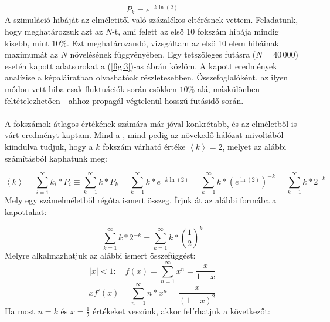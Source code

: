 \begin{equation}
    P_{k} = e^{-k \ln \left( 2 \right)}
\end{equation}
A szimuláció hibáját az elméletitől való százalékos eltérésnek vettem. Feladatunk, hogy meghatározzuk azt az $N$-t, ami felett az első 10 fokszám hibája mindig kisebb, mint $10\%$. Ezt meghatározandó, vizsgáltam az első 10 elem hibáinak maximumát az $N$ növelésének függvényében. Egy tetszőleges futásra ($N=40\,000$) esetén kapott adatsorokat a (\ref{fig:3})-as ábrán közlöm. A kapott eredmények analízise a képaláiratban olvashatóak részletesebben. Összefoglalóként, az ilyen módon vett hiba csak fluktuációk során csökken $10\%$ alá, máskülönben - feltételezhetően - ahhoz propagál végtelenül hosszú futásidő során.
\\ \\
A fokszámok átlagos értékének számára már jóval konkrétabb, és az elméletből is várt eredményt kaptam. Mind a \rrt, mind pedig az \apm növekedő hálózat mivoltából kiindulva tudjuk, hogy a $k$ fokszám várható értéke $\left< k \right> = 2$, melyet az alábbi számításból kaphatunk meg:

\begin{equation}
    \left< k \right>
    =
    \sum_{i = 1}^{\infty} k_{i} * P_{i}
    \equiv
    \sum_{k = 1}^{\infty} k * P_{k}
    =
    \sum_{k = 1}^{\infty} k * e^{-k \ln \left( 2 \right)}
    =
    \sum_{k = 1}^{\infty} k * \left( e^{\ln \left( 2 \right)} \right)^{-k}
    =
    \sum_{k = 1}^{\infty} k * 2^{-k}
\end{equation}
Mely egy számelméletből régóta ismert összeg. Írjuk át az alábbi formába a kapottakat:

\begin{equation}
    \sum_{k = 1}^{\infty} k * 2^{-k}
    =
    \sum_{k = 1}^{\infty} k * \left( \frac{1}{2} \right)^{k}
\end{equation}
Melyre alkalmazhatjuk az alábbi ismert összefüggést:
\begin{equation}
    \left| x \right| < 1:
    \quad
    f \left( x \right)
    =
    \sum_{n = 1}^{\infty} x^{n}
    =
    \frac{x}{1 - x}
\end{equation}
\begin{equation}
    xf' \left( x \right)
    =
    \sum_{n = 1}^{\infty} n * x^{n}
    =
    \frac{x}{(1 - x)^2}
\end{equation}
Ha most $n = k$ és $x = \frac{1}{2}$ értékeket veszünk, akkor felírhatjuk a következőt:

